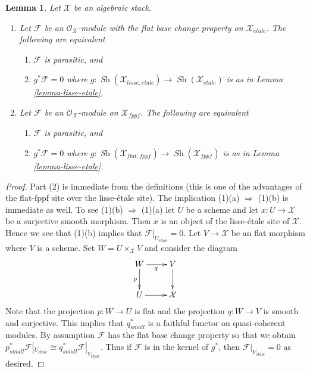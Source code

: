 \documentclass{stacks-project}
\theoremstyle{plain}
\newtheorem{lemma}[subsection]{Lemma}
\theoremstyle{definition}
\theoremstyle{remark}
\numberwithin{equation}{subsection}
\def\Sh{\mathop{\mathit{Sh}}\nolimits}
\def\etale{{\acute{e}tale}}
\begin{document}
\begin{lemma}
\label{lemma-parasitic-in-terms-flat-fppf}
Let $\mathcal{X}$ be an algebraic stack.
\begin{enumerate}
\item Let $\mathcal{F}$ be an $\mathcal{O}_\mathcal{X}$-module
with the flat base change property on $\mathcal{X}_\etale$.
The following are equivalent
\begin{enumerate}
\item $\mathcal{F}$ is parasitic, and
\item $g^*\mathcal{F} = 0$ where
$g : \Sh(\mathcal{X}_{lisse,\etale}) \to
\Sh(\mathcal{X}_\etale)$ is as in Lemma \ref{lemma-lisse-etale}.
\end{enumerate}
\item Let $\mathcal{F}$ be an $\mathcal{O}_\mathcal{X}$-module on
$\mathcal{X}_{fppf}$. The following are equivalent
\begin{enumerate}
\item $\mathcal{F}$ is parasitic, and
\item $g^*\mathcal{F} = 0$ where
$g :  \Sh(\mathcal{X}_{flat,fppf}) \to \Sh(\mathcal{X}_{fppf})$
is as in Lemma \ref{lemma-lisse-etale}.
\end{enumerate}
\end{enumerate}
\end{lemma}

\begin{proof}
Part (2) is immediate from the definitions (this is one of the advantages
of the flat-fppf site over the lisse-\'etale site). The implication
(1)(a) $\Rightarrow$ (1)(b) is immediate as well. To see (1)(b)
$\Rightarrow$ (1)(a) let $U$ be a scheme and let $x : U \to \mathcal{X}$
be a surjective smooth morphism. Then $x$ is an object of the
lisse-\'etale site of $\mathcal{X}$. Hence we see that (1)(b)
implies that $\mathcal{F}|_{U_\etale} = 0$. Let $V \to \mathcal{X}$
be an flat morphism where $V$ is a scheme. Set $W = U \times_\mathcal{X} V$
and consider the diagram
$$
\xymatrix{
W \ar[d]_p \ar[r]_q & V \ar[d] \\
U \ar[r] & \mathcal{X}
}
$$
Note that the projection $p : W \to U$ is flat and the projection
$q : W \to V$ is smooth and surjective. This implies that $q_{small}^*$
is a faithful functor on quasi-coherent modules. By assumption $\mathcal{F}$
has the flat base change property so that we obtain
$p_{small}^*\mathcal{F}|_{U_\etale} \cong
q_{small}^*\mathcal{F}|_{V_\etale}$. Thus if $\mathcal{F}$
is in the kernel of $g^*$, then $\mathcal{F}|_{V_\etale} = 0$
as desired.
\end{proof}
\end{document}
